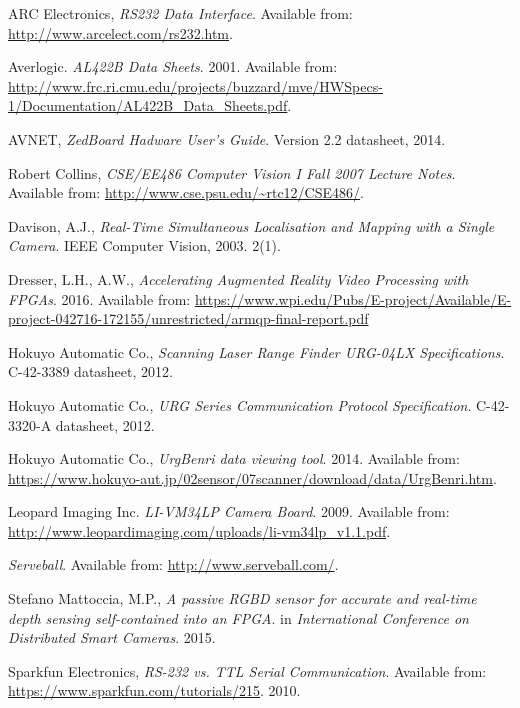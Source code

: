 \begin{thebibliography}{9}

ARC Electronics, \textit{RS232 Data Interface}. Available from: \url{http://www.arcelect.com/rs232.htm}.

Averlogic.
\textit{AL422B Data Sheets}. 2001.
Available from: \url{http://www.frc.ri.cmu.edu/projects/buzzard/mve/HWSpecs-1/Documentation/AL422B_Data_Sheets.pdf}.

AVNET, \textit{ZedBoard Hadware User's Guide}. Version 2.2 datasheet, 2014.

Robert Collins, \textit{CSE/EE486 Computer Vision I Fall 2007 Lecture Notes}. Available from: \url{http://www.cse.psu.edu/~rtc12/CSE486/}.

Davison, A.J.,
\textit{Real-Time Simultaneous Localisation and Mapping with a Single Camera}. 
IEEE Computer Vision, 2003. 2(1).

Dresser, L.H., A.W., \textit{Accelerating Augmented Reality Video Processing with FPGAs}. 2016. Available from: \url{https://www.wpi.edu/Pubs/E-project/Available/E-project-042716-172155/unrestricted/armqp-final-report.pdf} 

Hokuyo Automatic Co., \textit{Scanning Laser Range Finder URG-04LX Specifications}. C-42-3389 datasheet, 2012.

Hokuyo Automatic Co., \textit{URG Series Communication Protocol Specification}. C-42-3320-A datasheet, 2012.

Hokuyo Automatic Co., \textit{UrgBenri data viewing tool}. 2014. Available from: \url{https://www.hokuyo-aut.jp/02sensor/07scanner/download/data/UrgBenri.htm}.

Leopard Imaging Inc.
\textit{LI-VM34LP Camera Board}. 2009.
Available from: \url{http://www.leopardimaging.com/uploads/li-vm34lp_v1.1.pdf}.

\textit{Serveball}.
Available from: \url{http://www.serveball.com/}.

Stefano Mattoccia, M.P.,
\textit{A passive RGBD sensor for accurate and real-time depth sensing self-contained into an FPGA}.
in \textit{International Conference on Distributed Smart Cameras}. 2015.

Sparkfun Electronics, \textit{RS-232 vs. TTL Serial Communication}. Available from: \url{https://www.sparkfun.com/tutorials/215}. 2010.


\end{thebibliography}
